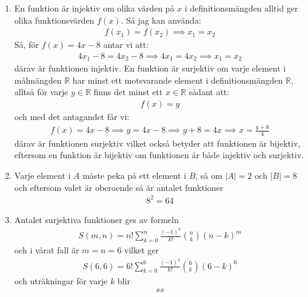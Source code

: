 \documentclass[a4paper,12pt]{article}
\begin{document}
\begin{enumerate}[label=\alph*)]
    \item En funktion är injektiv om olika värden på $x$ i definitionsmängden
    alltid ger olika funktionsvärden $f(x)$. Så jag kan använda:
    \begin{align*}
        f(x_1) = f(x_2) \implies x_1 = x_2
    \end{align*}
    Så, för $f(x) = 4x - 8$ antar vi
    att:
    \begin{align*}
        4x_1 - 8 = 4x_2 - 8 \implies 4x_1 = 4x_2 \implies x_1 = x_2
    \end{align*}
    därav är funktionen injektiv. En funktion är surjektiv om varje element i
    målmängden $\mathbb{R}$ har minst ett motsvarande element i
    definitionsmängden $\mathbb{R}$, alltså för varje $y \in \mathbb{R}$ finns
    det minst ett $x \in \mathbb{R}$ sådant att:
    \begin{align*}
        f(x) = y
    \end{align*}
    och med det antagandet får vi:
    \begin{align*}
        f(x) = 4x - 8 \implies y = 4x - 8 \implies y + 8 = 4x \implies x = \frac{y+8}{4}
    \end{align*}
    därav är funktionen surjektiv vilket också betyder att funktionen är
    bijektiv, eftersom en funktion är bijektiv om funktionen är både injektiv
    och surjektiv.
    \item Varje element i $A$ måste peka på ett element i $B$, så om $|A| = 2$
    och $|B| = 8$ och eftersom valet är oberoende så är antalet funktioner
    \begin{align*}
        8^2 = 64
    \end{align*}
    \item Antalet surjektiva funktioner ges av formeln
    \begin{align*}
        S(m, n) = n! \sum_{k=0}^{n} \frac{(-1)^k}{k!} \binom{n}{k} (n-k)^m
    \end{align*}
    och i vårat fall är $m = n = 6$ vilket ger
    \begin{align*}
        S(6, 6) = 6! \sum_{k=0}^{6} \frac{(-1)^k}{k!} \binom{6}{k} (6-k)^6
    \end{align*}
    och uträkningar för varje $k$ blir
    \begin{align*}
        ss
    \end{align*}
\end{enumerate}
\end{document}
